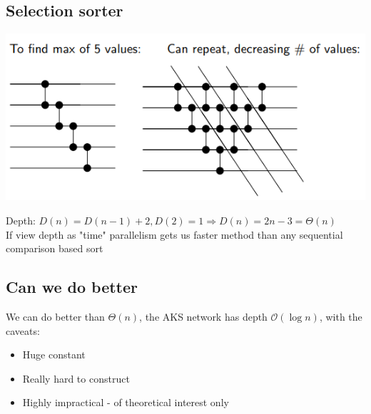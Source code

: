\documentclass{article}[18pt]
\begin{document}
\subsection{Selection sorter}
\begin{center}
\includegraphics[scale=0.7]{selection}
\end{center}
Depth: $D ( n ) = D ( n - 1 ) + 2 , D ( 2 ) = 1 \Rightarrow D ( n ) = 2 n - 3 = \Theta ( n )$\\
If view depth as "time" parallelism gets us faster method than any sequential comparison based sort
\subsection{Can we do better}
We can do better than $\Theta(n)$, the AKS network has depth $\mathcal{O}(\log n)$, with the caveats:
\begin{itemize}
\item Huge constant
\item Really hard to construct
\item Highly impractical - of theoretical interest only 
\end{itemize}
\end{document}
